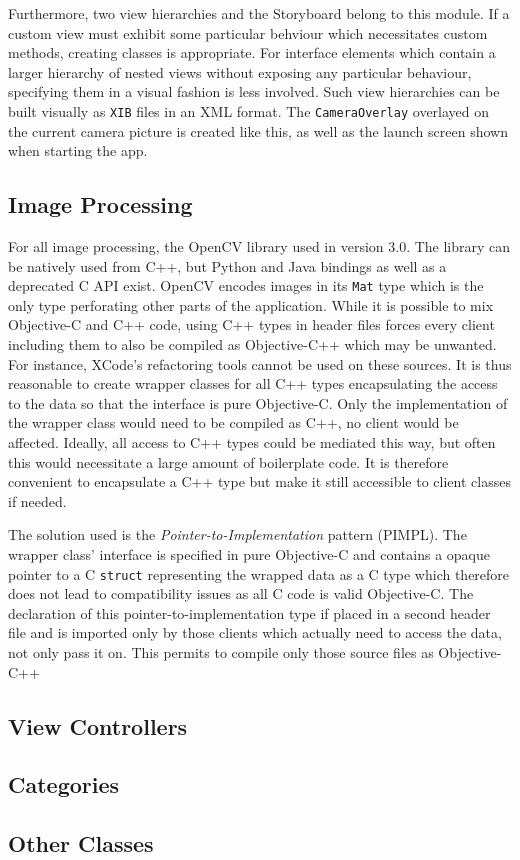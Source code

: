 Furthermore, two view hierarchies and the Storyboard belong to this module.  If
a custom view must exhibit some particular behviour which necessitates custom
methods, creating classes is appropriate. For interface elements which contain a
larger hierarchy of nested views without exposing any particular behaviour,
specifying them in a visual fashion is less involved. Such view hierarchies can
be built visually as \texttt{XIB} files in an XML format. The
\texttt{CameraOverlay} overlayed on the current camera picture is created like
this, as well as the launch screen shown when starting the app.

\subsection{Image Processing}

For all image processing, the OpenCV library used in version 3.0. The library
can be natively used from C++, but Python and Java bindings as well as a
deprecated C API exist. OpenCV encodes images in its \texttt{Mat} type which is
the only type perforating other parts of the application. 
While it is possible to mix Objective-C and C++ code,
using C++ types in header files forces every client including them to also be
compiled as Objective-C++ which may be unwanted. For instance, XCode's
refactoring tools cannot be used on these sources. It is thus reasonable to create
wrapper classes for all C++ types encapsulating the access to the data so that
the interface is pure Objective-C. Only the implementation of the wrapper class
would need to be compiled as C++, no client would be affected. Ideally, all
access to C++ types could be mediated this way, but often this would necessitate 
a large amount of boilerplate code.
It is therefore convenient to encapsulate a C++ type but make it still accessible to
client classes if needed. 

The solution used is the \emph{Pointer-to-Implementation}
pattern (PIMPL). The wrapper class' interface is specified in pure Objective-C
and contains a opaque pointer to a C \texttt{struct} representing the wrapped
data as a C type which therefore does not lead to compatibility issues as
all C code is valid Objective-C. The declaration of this
pointer-to-implementation type if placed in a second header file and is imported
only by those clients which actually need to access the data, not only pass it
on. This permits to compile only those source files as Objective-C++

\subsection{View Controllers}

\subsection{Categories}

\subsection{Other Classes}


